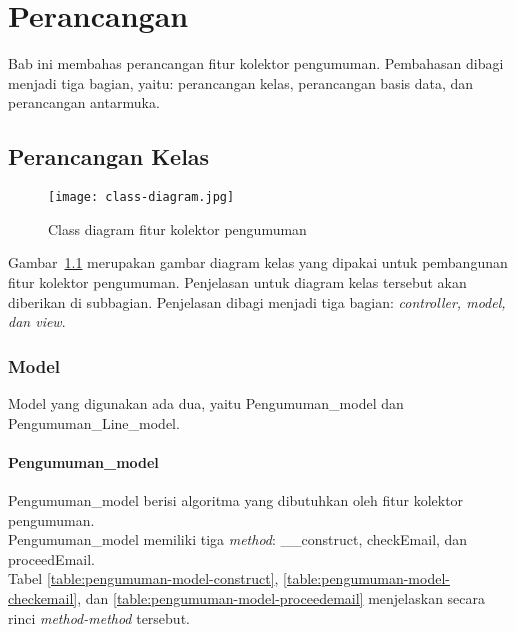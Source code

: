 \chapter{Perancangan}
\label{chap:perancangan}

Bab ini membahas perancangan fitur kolektor pengumuman. Pembahasan dibagi menjadi tiga bagian, yaitu: perancangan kelas, perancangan basis data, dan perancangan antarmuka.
 
\section{Perancangan Kelas}
\begin{figure}[H]
	\centering  
	\texttt{[image: class-diagram.jpg]}  
	\caption[Class diagram fitur kolektor pengumuman]{Class diagram fitur kolektor pengumuman} 
	\label{fig:class-diagram} 
\end{figure}
Gambar~\ref{fig:class-diagram} merupakan gambar diagram kelas yang dipakai untuk pembangunan fitur kolektor pengumuman. Penjelasan untuk diagram kelas tersebut akan diberikan di subbagian. Penjelasan dibagi menjadi tiga bagian: \textit{controller, model, dan view}.

\subsection{Model}
Model yang digunakan ada dua, yaitu Pengumuman\_model dan Pengumuman\_Line\_model.
\subsubsection{Pengumuman\_model}
Pengumuman\_model berisi algoritma yang dibutuhkan oleh fitur kolektor pengumuman. \\Pengumuman\_model memiliki tiga \textit{method}: \_\_construct, checkEmail, dan proceedEmail. \\Tabel \ref{table:pengumuman-model-construct}, \ref{table:pengumuman-model-checkemail}, dan \ref{table:pengumuman-model-proceedemail} menjelaskan secara rinci \textit{method-method} tersebut.

